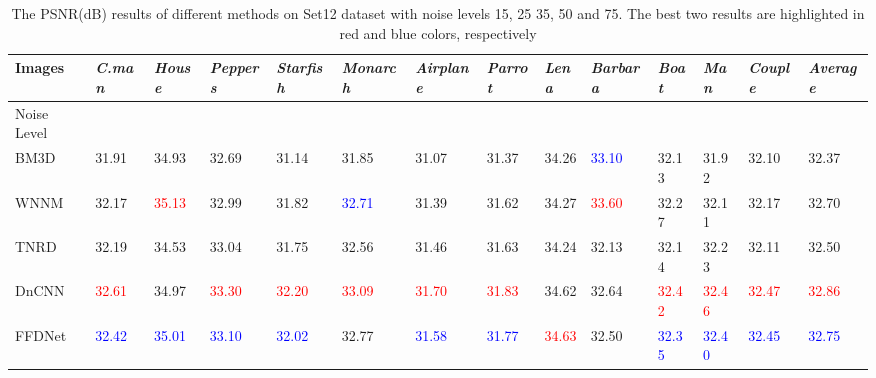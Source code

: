\documentclass[journal]{IEEEtran}
\begin{document}
\begin{table*}[!htbp]\footnotesize{}
\caption{The PSNR(dB) results of different  methods on Set12 dataset with noise levels 15, 25 35, 50 and 75. The best two results are highlighted in \textcolor[rgb]{1.00,0.00,0.00}{red} and \textcolor[rgb]{0.00,0.00,1.00}{blue} colors, respectively}
\center
\begin{tabular}{|p{1.55cm}<{\centering}|p{0.8cm}<{\centering}|p{0.8cm}<{\centering}|p{0.8cm}<{\centering}|p{0.8cm}<{\centering}|p{0.8cm}<{\centering}|p{0.8cm}<{\centering}|p{0.8cm}<{\centering}|p{0.8cm}<{\centering}|p{0.8cm}<{\centering}|p{0.8cm}<{\centering}|p{0.8cm}<{\centering}|p{0.8cm}<{\centering}|p{.85cm}<{\centering}|}
  \hline\rowcolor[gray]{.9}
Images & \scriptsize{\emph{C.man}} & \scriptsize{\emph{House}} & \scriptsize{\emph{Peppers}} & \scriptsize{\emph{Starfish}} & \scriptsize{\emph{Monarch}} &\scriptsize{\emph{Airplane}} & \scriptsize{\emph{Parrot}} & \scriptsize{\emph{Lena}} & \scriptsize{\emph{Barbara}} & \scriptsize{\emph{Boat}} & \scriptsize{\emph{Man}} & \scriptsize{\emph{Couple}} & \scriptsize{\emph{Average}} \\ \hline \hline
    Noise Level & \multicolumn{13}{c|}{}   \\ \hline
    BM3D & 31.91 & 34.93 & 32.69 & 31.14 & 31.85 & 31.07 & 31.37 & 34.26 & \textcolor{blue}{33.10} & 32.13 & 31.92 & 32.10 & 32.37  \\\hline
    WNNM& 32.17 & \textcolor{red}{35.13} & 32.99 & 31.82 & \textcolor{blue}{32.71} & 31.39 & 31.62 & 34.27 & \textcolor{red}{33.60} & 32.27 & 32.11 & 32.17 &  32.70  \\\hline
     TNRD& 32.19 & 34.53 & 33.04 & 31.75 & 32.56 & 31.46 & 31.63 & 34.24 & 32.13 & 32.14 & 32.23 & 32.11 & 32.50  \\\hline
     DnCNN& \textcolor{red}{32.61} & 34.97 & \textcolor{red}{33.30} & \textcolor{red}{32.20} & \textcolor{red}{33.09} & \textcolor{red}{31.70} & \textcolor{red}{31.83} & 34.62 & 32.64 & \textcolor{red}{32.42} & \textcolor{red}{32.46} & \textcolor{red}{32.47} &  \textcolor{red}{32.86}  \\\hline
    FFDNet & \textcolor{blue}{32.42} & \textcolor{blue}{35.01} & \textcolor{blue}{33.10} & \textcolor{blue}{32.02} & 32.77 & \textcolor{blue}{31.58} & \textcolor{blue}{31.77} & \textcolor{red}{34.63} & 32.50 & \textcolor{blue}{32.35} & \textcolor{blue}{32.40} & \textcolor{blue}{32.45} &  \textcolor{blue}{32.75}  \\\hline



\end{tabular}
\end{table*}
\end{document}
